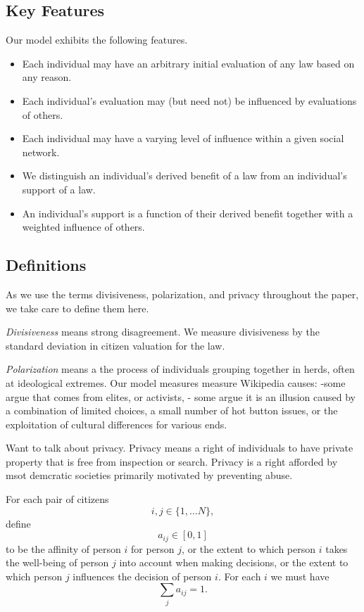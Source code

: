 \subsection{Key Features}
Our model exhibits the following features. 
\begin{itemize}
\item Each individual may have an arbitrary initial evaluation of any law based on any reason.
\item Each individual's evaluation may (but need not) be influenced by evaluations of others.
\item Each individual may have a varying level of influence within a given social network.
\item We distinguish an individual's derived benefit of a law from an individual's support of a law. 
\item An individual's support is a function of their derived benefit together with a weighted influence of others. %
\end{itemize}


\subsection{Definitions}
As we use the terms divisiveness, polarization, and privacy throughout the paper, we take care to define them here.

\emph{Divisiveness} means strong disagreement. We measure divisiveness by the standard deviation in citizen valuation for the law.

\emph{Polarization} means a the process of individuals grouping together in herds, often at ideological extremes. Our model measures  measure 
Wikipedia causes: 
-some argue that comes from elites, or activists,
- some argue it is an illusion caused by a combination of limited choices, a small number of hot button issues, or the exploitation of cultural differences for various ends.

Want to talk about privacy.
Privacy means a right of individuals to have private property that is free from inspection or search. Privacy is a right afforded by msot demcratic societies primarily motivated by preventing abuse.

For each pair of citizens $$i,j\in\{1,\dots N\},$$ define $$a_{ij}\in [0,1]$$ to be the affinity of person $i$ for person $j$, or the extent to which person $i$ takes the well-being of person $j$ into account when making decisions, or the extent to which person $j$ influences the decision of person $i$. For each $i$ we must have $$\sum_ja_{ij}=1.$$%

